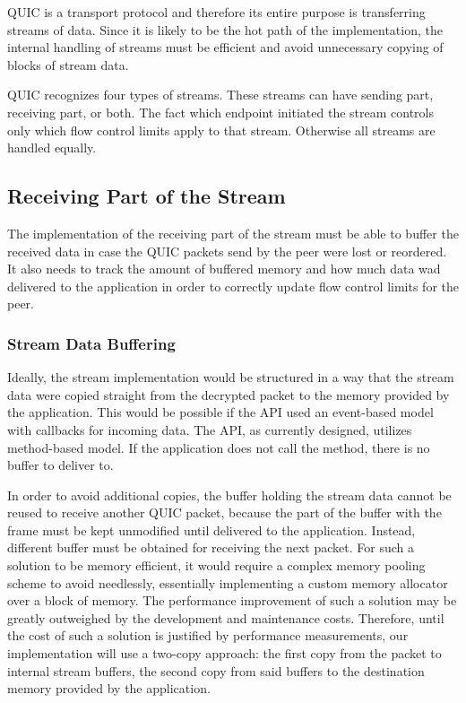 QUIC is a transport protocol and therefore its entire purpose is transferring streams of data. Since
it is likely to be the hot path of the implementation, the internal handling of streams must be
efficient and avoid unnecessary copying of blocks of stream data.

QUIC recognizes four types of streams. These streams can have sending part, receiving part, or both.
The fact which endpoint initiated the stream controls only which flow control limits apply to that
stream. Otherwise all streams are handled equally.

\subsection{Receiving Part of the Stream}

The implementation of the receiving part of the stream must be able to buffer the received data in
case the QUIC packets send by the peer were lost or reordered. It also needs to track the amount of
buffered memory and how much data wad delivered to the application in order to correctly update flow
control limits for the peer.

\subsubsection{Stream Data Buffering}

Ideally, the stream implementation would be structured in a way that the stream data were copied
straight from the decrypted packet to the memory provided by the application. This would be possible
if the API used an event-based model with callbacks for incoming data. The API, as currently
designed, utilizes method-based model. If the application does not call the 
method, there is no buffer to deliver to.

In order to avoid additional copies, the buffer holding the stream data cannot be reused to receive
another QUIC packet, because the part of the buffer with the \STREAM{} frame must be kept unmodified
until delivered to the application. Instead, different buffer must be obtained for receiving the
next packet. For such a solution to be memory efficient, it would require a complex memory pooling
scheme to avoid needlessly, essentially implementing a custom memory allocator over a block of
memory. The performance improvement of such a solution may be greatly outweighed by the development
and maintenance costs. Therefore, until the cost of such a solution is justified by performance
measurements, our implementation will use a two-copy approach: the first copy from the packet to
internal stream buffers, the second copy from said buffers to the destination memory provided by the
application.

